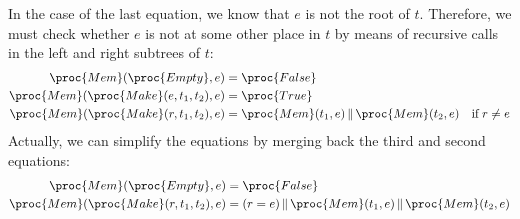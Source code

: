 \begin{enumerate}
       In the case of the last equation, we know that \(e\) is
         not the root of \(t\). Therefore, we must check whether \(e\)
         is not at some other place in \(t\) by means of recursive
         calls in the left and right subtrees of \(t\):
       \begin{align*}
            \proc{Mem} (\proc{Empty}, e) 
         &= \proc{False}\\
            \proc{Mem} (\proc{Make} (e, t_1, t_2), e) 
         &= \proc{True}\\
            \proc{Mem} (\proc{Make} (r, t_1, t_2), e) 
         &= \proc{Mem} (t_1, e) \, \| \, \proc{Mem} (t_2, e)
         & \text{if} \; r \neq e
       \end{align*}
       Actually, we can simplify the equations by merging back the
       third and second equations:
       \begin{align*}
            \proc{Mem} (\proc{Empty}, e) 
         &= \proc{False}\\
            \proc{Mem} (\proc{Make} (r, t_1, t_2), e) 
         &= (r = e) \, \| \, \proc{Mem} (t_1, e) \, \| \, \proc{Mem} (t_2, e)
       \end{align*}


\end{enumerate}
